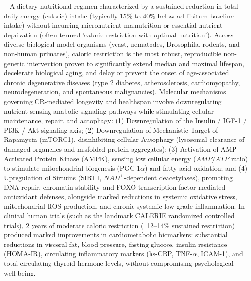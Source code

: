 -- A dietary nutritional regimen characterized by a sustained reduction in total daily energy (caloric) intake (typically 15\% to 40\% below ad libitum baseline intake) without incurring micronutrient malnutrition or essential nutrient deprivation (often termed 'caloric restriction with optimal nutrition'). Across diverse biological model organisms (yeast, nematodes, Drosophila, rodents, and non-human primates), caloric restriction is the most robust, reproducible non-genetic intervention proven to significantly extend median and maximal lifespan, decelerate biological aging, and delay or prevent the onset of age-associated chronic degenerative diseases (type 2 diabetes, atherosclerosis, cardiomyopathy, neurodegeneration, and spontaneous malignancies). Molecular mechanisms governing CR-mediated longevity and healthspan involve downregulating nutrient-sensing anabolic signaling pathways while stimulating cellular maintenance, repair, and autophagy: (1) Downregulation of the Insulin / IGF-1 / PI3K / Akt signaling axis; (2) Downregulation of Mechanistic Target of Rapamycin (mTORC1), disinhibiting cellular Autophagy (lysosomal clearance of damaged organelles and misfolded protein aggregates); (3) Activation of AMP-Activated Protein Kinase (AMPK), sensing low cellular energy ($AMP/ATP$ ratio) to stimulate mitochondrial biogenesis (PGC-1$\alpha$) and fatty acid oxidation; and (4) Upregulation of Sirtuins (SIRT1, $NAD^+$-dependent deacetylases), promoting DNA repair, chromatin stability, and FOXO transcription factor-mediated antioxidant defenses, alongside marked reductions in systemic oxidative stress, mitochondrial ROS production, and chronic systemic low-grade inflammation. In clinical human trials (such as the landmark CALERIE randomized controlled trials), 2 years of moderate caloric restriction (~12--14\% sustained restriction) produced marked improvements in cardiometabolic biomarkers: substantial reductions in visceral fat, blood pressure, fasting glucose, insulin resistance (HOMA-IR), circulating inflammatory markers (hs-CRP, TNF-$\alpha$, ICAM-1), and total circulating thyroid hormone levels, without compromising psychological well-being.

